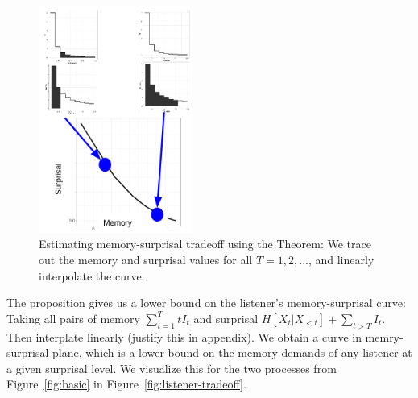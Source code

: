 \documentclass[11pt,letterpaper]{article}
\begin{document}
\begin{figure}
	\begin{center}
\includegraphics[width=0.45\textwidth]{figures/interpolate-curve.png}
\end{center}
	\caption{Estimating memory-surprisal tradeoff using the Theorem: We trace out the memory and surprisal values for all $T=1, 2, ...$, and linearly interpolate the curve.}\label{fig:interpolate}
\end{figure}







The proposition gives us a lower bound on the listener's memory-surprisal curve: Taking all pairs of memory $\sum_{t=1}^T t I_t$ and surprisal $H[X_t|X_{<t}] + \sum_{t > T} I_t$.
Then interplate linearly (justify this in appendix).
We obtain a curve in memry-surprisal plane, which is a lower bound on the memory demands of any listener at a given surprisal level.
We visualize this for the two processes from Figure~\ref{fig:basic} in Figure~\ref{fig:listener-tradeoff}.
\end{document}
